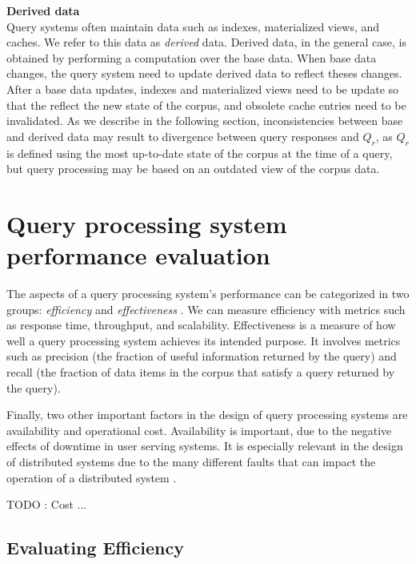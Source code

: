 \noindent
\textbf{Derived data} \\
Query systems often maintain data such as indexes, materialized views, and caches.
We refer to this data as \textit{derived} data.
Derived data, in the general case, is obtained by performing a computation over the base data.
When base data changes, the query system need to update derived data to reflect theses changes.
After a base data updates, indexes and materialized views need to be update so that the reflect the new state of the corpus,
and obsolete cache entries need to be invalidated.
As we describe in the following section, inconsistencies between base and derived data may result to divergence between
query responses and $Q_r$, as $Q_r$ is defined using the most up-to-date state of the corpus at the time of a query, but
query processing may be based on an outdated view of the corpus data.

\section{Query processing system performance evaluation}
\label{sec:requirements}


The aspects of a query processing system's performance can be categorized in two groups:
\textit{efficiency} and \textit{effectiveness} \cite{buttcher:informationretrieval}.
We can measure efficiency with metrics such as response time, throughput, and scalability.
Effectiveness is a measure of how well a query processing system achieves its intended purpose.
It involves metrics such as precision (the fraction of useful information returned by the query) and recall
(the fraction of data items in the corpus that satisfy a query returned by the query).

Finally, two other important factors in the design of query processing systems are availability and operational cost.
Availability is important, due to the negative effects of downtime in user serving systems.
It is especially relevant in the design of distributed systems due to the many different faults that can impact the
operation of a distributed system \cite{kleppmann:designing}.

TODO : Cost ...

\subsection{Evaluating Efficiency}

